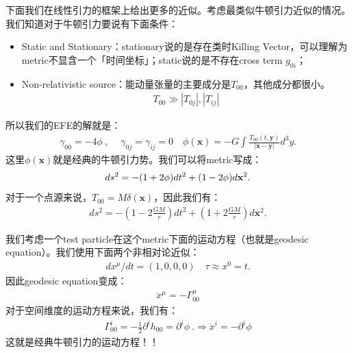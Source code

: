 下面我们在线性引力的框架上给出更多的近似。考虑最类似牛顿引力近似的情况。我们知道对于牛顿引力要说有下面条件：
\begin{itemize}
  \item Static and Stationary：stationary说的是存在类时Killing
    Vector，可以理解为metric不显含一个「时间坐标」；static说的是不存在cross term $ g_{0i} $；
  \item Non-relativistic source：能动量张量的主要成分是$ T_{00} $，其他成分都很小。
    \begin{align}
      T_{00}\gg|T_{0j}|,|T_{ij}|
    \end{align}
\end{itemize}
所以我们的EFE的解就是：
\begin{align}
  \gamma_{00}=-4\phi\mathrm{~,~}\quad\gamma_{0j}=\gamma_{ij}=0 \quad
  \phi(\mathbf{x})=-G\int\frac{T_{00}(t,\mathbf{y})}{|\mathbf{x}-\mathbf{y}|}d^3y.
\end{align}
这里$ \phi(\mathbf{x}) $就是经典的牛顿引力势。我们可以将metric写成：
\begin{align}
  \large ds^2=-(1+2\phi)dt^2+(1-2\phi)d\mathbf{x}^2.
\end{align}
对于一个点源来说，$ T_{00} = M \delta(\mathbf{x}) $，因此我们有：
\begin{align}\label{eq:nearlynewtonianmetric}
  ds^2=-\left(1-2\frac{GM}{r}\right)dt^2+\left(1+2\frac{GM}{r}\right)d\mathbf{x}^2.
\end{align}

\bigskip
{}

我们考虑一个test particle在这个metric下面的运动方程（也就是geodesic equation）。我们使用下面两个非相对论近似：
\begin{align}
  dx^\mu/dt=(1,0,0,0) \quad \tau\approx x^0=t.
\end{align}
因此geodesic equation变成：
\begin{align}
  \ddot{x}^\mu=-\Gamma_{00}^\mu
\end{align}
对于空间维度的运动方程来说，我们有：
\begin{align}
  \Gamma_{00}^i=-\frac{1}{2}\partial^ih_{00}=\partial^i\phi\mathrm{~.}
  \Rightarrow \ddot{x}^i=-\partial^i\phi
\end{align}
这就是经典牛顿引力的运动方程！！

